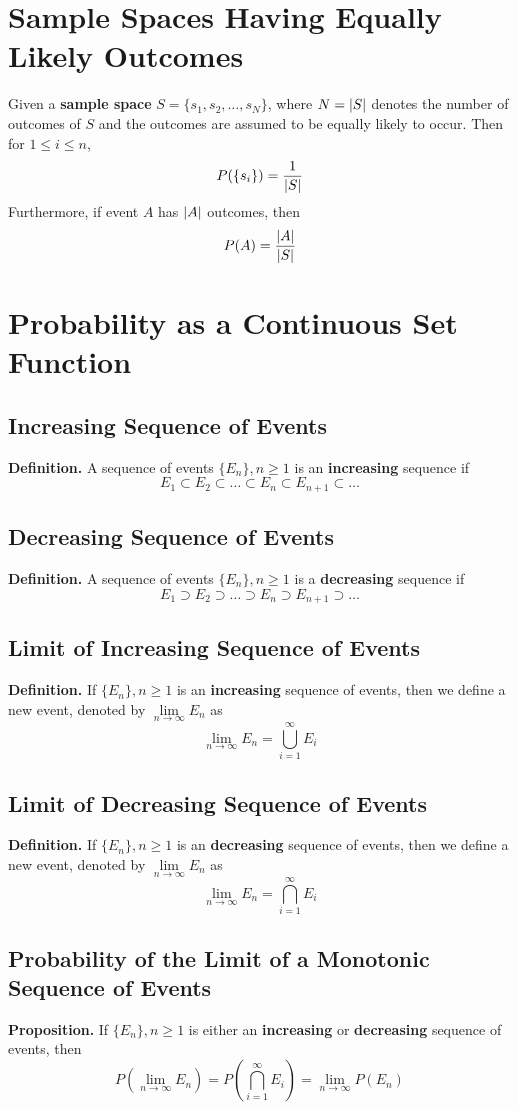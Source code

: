 \documentclass[../st2131_notes.tex]{subfiles}
\begin{document}
\section{Sample Spaces Having Equally Likely Outcomes}
Given a \textbf{sample space} \(S=\{s_1,s_2,\ldots,s_N\}\), where \(N=\lvert S\rvert\) denotes the number of outcomes of \(S\) and the outcomes are assumed to be equally likely to occur. Then for \(1\leq i\leq n\),
\[P(\{s_i\})=\frac{1}{\lvert S\rvert}\]
Furthermore, if event \(A\) has \(\lvert A\rvert\) outcomes, then
\[P(A)=\frac{\lvert A\rvert}{\lvert S\rvert}\]

\section{Probability as a Continuous Set Function}
\subsection{Increasing Sequence of Events}
\textbf{Definition.} A sequence of events \(\{E_n\},n\geq1\) is an \textbf{increasing} sequence if
\[E_1\subset E_2\subset\ldots\subset E_n\subset E_{n+1}\subset\ldots\]

\subsection{Decreasing Sequence of Events}
\textbf{Definition.} A sequence of events \(\{E_n\},n\geq1\) is a \textbf{decreasing} sequence if
\[E_1\supset E_2\supset\ldots\supset E_n\supset E_{n+1}\supset\ldots\]

\subsection{Limit of Increasing Sequence of Events}
\textbf{Definition.} If \(\{E_n\},n\geq1\) is an \textbf{increasing} sequence of events, then we define a new event, denoted by \(\lim\limits_{n\to\infty}E_n\) as
\[\lim_{n\to\infty}E_n=\bigcup_{i=1}^\infty E_i\]

\subsection{Limit of Decreasing Sequence of Events}
\textbf{Definition.} If \(\{E_n\},n\geq1\) is an \textbf{decreasing} sequence of events, then we define a new event, denoted by \(\lim\limits_{n\to\infty}E_n\) as
\[\lim_{n\to\infty}E_n=\bigcap_{i=1}^\infty E_i\]

\subsection{Probability of the Limit of a Monotonic Sequence of Events}
\textbf{Proposition.} If \(\{E_n\},n\geq1\) is either an \textbf{increasing} or \textbf{decreasing} sequence of events, then
\[P\left(\lim_{n\to\infty}E_n\right)=P\left(\bigcap_{i=1}^\infty E_i\right)=\lim_{n\to\infty}P(E_n)\]
\end{document}
